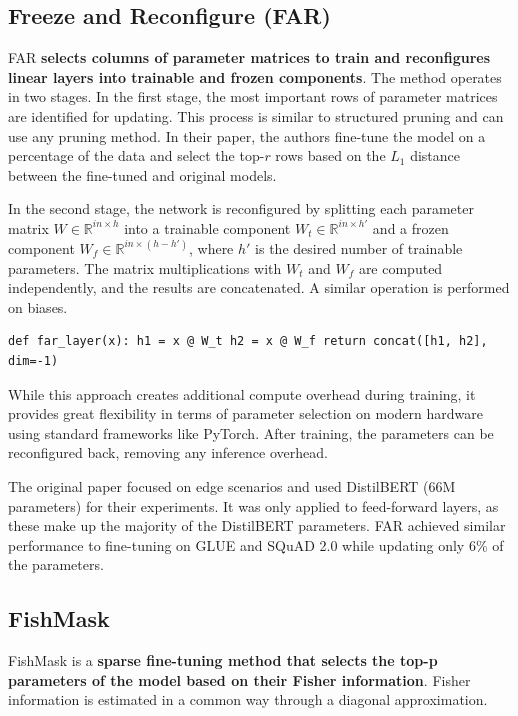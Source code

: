 \subsection{Freeze and Reconfigure (FAR)}
\label{sec:far}

FAR \citep{far_edge} \textbf{selects columns of parameter matrices to train and reconfigures linear layers into trainable and frozen components}. The method operates in two stages. In the first stage, the most important rows of parameter matrices are identified for updating. This process is similar to structured pruning and can use any pruning method. In their paper, the authors fine-tune the model on a percentage of the data and select the top-$r$ rows based on the $L_1$ distance between the fine-tuned and original models.

In the second stage, the network is reconfigured by splitting each parameter matrix $W \in \mathbb{R}^{in \times h}$ into a trainable component $W_{t} \in \mathbb{R}^{in \times h'}$ and a frozen component $W_{f} \in \mathbb{R}^{in \times (h - h')}$, where $h'$ is the desired number of trainable parameters. The matrix multiplications with $W_{t}$ and $W_{f}$ are computed independently, and the results are concatenated. A similar operation is performed on biases.

\begin{lstlisting}
def far_layer(x): h1 = x @ W_t h2 = x @ W_f return concat([h1, h2], dim=-1)
\end{lstlisting}

While this approach creates additional compute overhead during training, it provides great flexibility in terms of parameter selection on modern hardware using standard frameworks like PyTorch. After training, the parameters can be reconfigured back, removing any inference overhead.

The original paper focused on edge scenarios and used DistilBERT (66M parameters) for their experiments. It was only applied to feed-forward layers, as these make up the majority of the DistilBERT parameters. FAR achieved similar performance to fine-tuning on GLUE and SQuAD 2.0 \citep{squad2} while updating only 6\% of the parameters.

\subsection{FishMask}

FishMask \citep{fish_mask} is a \textbf{sparse fine-tuning method that selects the top-p parameters of the model based on their Fisher information}. Fisher information is estimated in a common way through a diagonal approximation.

